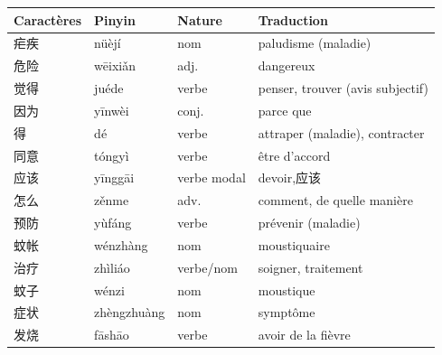 \documentclass[11pt]{article}
\begin{document}
\begin{definition}
\begin{center}
\begin{tabularx}{\linewidth}{|X|X|X|X|}
\hline
\rowcolor{popblueL} \textbf{Caractères} & \textbf{Pinyin} & \textbf{Nature} & \textbf{Traduction} \\ \hline
疟疾 & nüèjí & nom & paludisme (maladie) \\ \hline
危险 & wēixiǎn & adj. & dangereux \\ \hline
觉得 & juéde & verbe & penser, trouver (avis subjectif) \\ \hline
因为 & yīnwèi & conj. & parce que \\ \hline
得 & dé & verbe & attraper (maladie), contracter \\ \hline
同意 & tóngyì & verbe & être d'accord \\ \hline
应该 & yīnggāi & verbe modal & devoir,应该 \\ \hline
怎么 & zěnme & adv. & comment, de quelle manière \\ \hline
预防 & yùfáng & verbe & prévenir (maladie) \\ \hline
蚊帐 & wénzhàng & nom & moustiquaire \\ \hline
治疗 & zhìliáo & verbe/nom & soigner, traitement \\ \hline
蚊子 & wénzi & nom & moustique \\ \hline
症状 & zhèngzhuàng & nom & symptôme \\ \hline
发烧 & fāshāo & verbe & avoir de la fièvre \\ \hline
\end{tabularx}
\end{center}
\end{definition}
\end{document}
